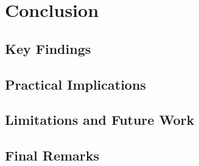 \section{Conclusion}
\label{sec:conclusion}

\subsection{Key Findings}

\subsection{Practical Implications}

\subsection{Limitations and Future Work}

\subsection{Final Remarks}

